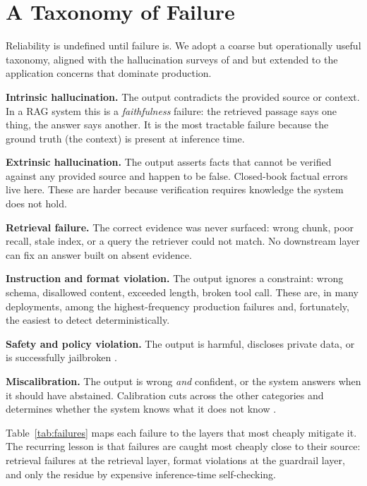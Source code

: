 \documentclass[11pt]{article}
\begin{document}
\section{A Taxonomy of Failure}
\label{sec:failures}

Reliability is undefined until failure is. We adopt a coarse but operationally
useful taxonomy, aligned with the hallucination surveys of
\citet{ji2023hallucination} and \citet{huang2023hallucination} but extended to
the application concerns that dominate production.

\textbf{Intrinsic hallucination.} The output contradicts the provided source or
context. In a RAG system this is a \emph{faithfulness} failure: the retrieved
passage says one thing, the answer says another. It is the most tractable
failure because the ground truth (the context) is present at inference time.

\textbf{Extrinsic hallucination.} The output asserts facts that cannot be
verified against any provided source and happen to be false. Closed-book
factual errors live here. These are harder because verification requires
knowledge the system does not hold.

\textbf{Retrieval failure.} The correct evidence was never surfaced: wrong
chunk, poor recall, stale index, or a query the retriever could not match. No
downstream layer can fix an answer built on absent evidence.

\textbf{Instruction and format violation.} The output ignores a constraint:
wrong schema, disallowed content, exceeded length, broken tool call. These are,
in many deployments, among the highest-frequency production failures and,
fortunately, the easiest to detect deterministically.

\textbf{Safety and policy violation.} The output is harmful, discloses private
data, or is successfully jailbroken \citep{perez2022redteaming,ganguli2022redteaming}.

\textbf{Miscalibration.} The output is wrong \emph{and} confident, or the system
answers when it should have abstained. Calibration cuts across the other
categories and determines whether the system knows what it does not know
\citep{kadavath2022know}.

Table~\ref{tab:failures} maps each failure to the layers that most cheaply
mitigate it. The recurring lesson is that failures are caught most cheaply
close to their source: retrieval failures at the retrieval layer, format
violations at the guardrail layer, and only the residue by expensive
inference-time self-checking.
\end{document}

